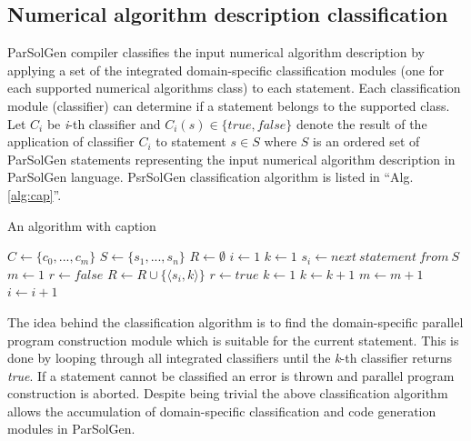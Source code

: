 \documentclass[conference]{IEEEtran}
\begin{document}
\subsection{Numerical algorithm description classification}
ParSolGen compiler classifies the input numerical algorithm description by applying a set 
of the integrated domain-specific classification modules (one for each supported numerical algorithms class) to 
each statement. Each classification module (classifier) can determine if a statement belongs to the supported class. 
Let \(C_i\) be \textit{i}-th classifier and \(C_i(s) \in \{true, false\}\) denote the result of the application of 
classifier \(C_i\) to statement \(s \in S\) where \(S\) is an ordered set of ParSolGen statements representing the 
input numerical algorithm description in ParSolGen language. PsrSolGen classification algorithm is listed in ``Alg. \ref{alg:cap}''.
\begin{algorithm}
	\caption{An algorithm with caption}\label{alg:cap}
	\begin{algorithmic}
		\State $C \gets \{c_0, ..., c_m\}$ 
		\State $S \gets \{s_1, ..., s_n\}$ 
		\State $R \gets \emptyset$ 
		\State $i \gets 1$ 
		\State $k \gets 1$ 
		\State $s_i \gets next\ statement\ from\ S$
		\State $m \gets 1$
		\State $r \gets false $ 
		\State $R \gets R \cup \{ \langle s_i, k \rangle \} $
		\State $r \gets true$
		\Else
		\State $k \gets 1$
		\Else
		\State $k \gets k + 1$
		\EndIf
		\EndIf
		\State $m \gets m + 1$
		\EndWhile
		 
		\EndIf
		\State $i \gets i + 1$
		\EndWhile
	\end{algorithmic}
\end{algorithm}

The idea behind the classification algorithm is to find the domain-specific parallel program construction 
module which is suitable for the current statement. This is done by looping through all integrated classifiers 
until the \textit{k}-th classifier returns \textit{true}. If a statement cannot be classified an error is thrown and 
parallel program construction is aborted. 
Despite being trivial the above classification algorithm allows the accumulation of domain-specific 
classification and code generation modules in ParSolGen.
\end{document}
